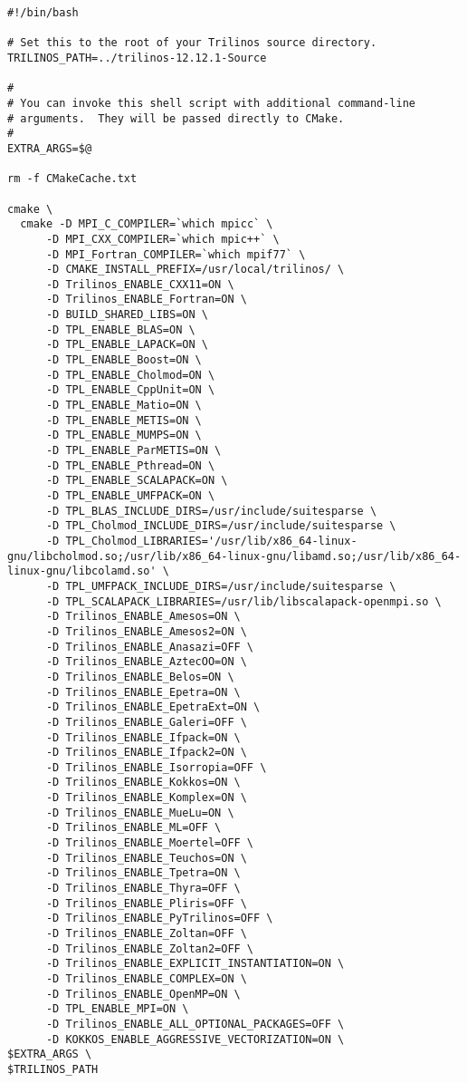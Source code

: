 \begin{verbatim}
#!/bin/bash

# Set this to the root of your Trilinos source directory.
TRILINOS_PATH=../trilinos-12.12.1-Source

#
# You can invoke this shell script with additional command-line
# arguments.  They will be passed directly to CMake.
#
EXTRA_ARGS=$@

rm -f CMakeCache.txt

cmake \
  cmake -D MPI_C_COMPILER=`which mpicc` \
      -D MPI_CXX_COMPILER=`which mpic++` \
      -D MPI_Fortran_COMPILER=`which mpif77` \
      -D CMAKE_INSTALL_PREFIX=/usr/local/trilinos/ \
      -D Trilinos_ENABLE_CXX11=ON \
      -D Trilinos_ENABLE_Fortran=ON \
      -D BUILD_SHARED_LIBS=ON \
      -D TPL_ENABLE_BLAS=ON \
      -D TPL_ENABLE_LAPACK=ON \
      -D TPL_ENABLE_Boost=ON \
      -D TPL_ENABLE_Cholmod=ON \
      -D TPL_ENABLE_CppUnit=ON \
      -D TPL_ENABLE_Matio=ON \
      -D TPL_ENABLE_METIS=ON \
      -D TPL_ENABLE_MUMPS=ON \
      -D TPL_ENABLE_ParMETIS=ON \
      -D TPL_ENABLE_Pthread=ON \
      -D TPL_ENABLE_SCALAPACK=ON \
      -D TPL_ENABLE_UMFPACK=ON \
      -D TPL_BLAS_INCLUDE_DIRS=/usr/include/suitesparse \
      -D TPL_Cholmod_INCLUDE_DIRS=/usr/include/suitesparse \
      -D TPL_Cholmod_LIBRARIES='/usr/lib/x86_64-linux-gnu/libcholmod.so;/usr/lib/x86_64-linux-gnu/libamd.so;/usr/lib/x86_64-linux-gnu/libcolamd.so' \
      -D TPL_UMFPACK_INCLUDE_DIRS=/usr/include/suitesparse \
      -D TPL_SCALAPACK_LIBRARIES=/usr/lib/libscalapack-openmpi.so \
      -D Trilinos_ENABLE_Amesos=ON \
      -D Trilinos_ENABLE_Amesos2=ON \
      -D Trilinos_ENABLE_Anasazi=OFF \
      -D Trilinos_ENABLE_AztecOO=ON \
      -D Trilinos_ENABLE_Belos=ON \
      -D Trilinos_ENABLE_Epetra=ON \
      -D Trilinos_ENABLE_EpetraExt=ON \
      -D Trilinos_ENABLE_Galeri=OFF \
      -D Trilinos_ENABLE_Ifpack=ON \
      -D Trilinos_ENABLE_Ifpack2=ON \
      -D Trilinos_ENABLE_Isorropia=OFF \
      -D Trilinos_ENABLE_Kokkos=ON \
      -D Trilinos_ENABLE_Komplex=ON \
      -D Trilinos_ENABLE_MueLu=ON \
      -D Trilinos_ENABLE_ML=OFF \
      -D Trilinos_ENABLE_Moertel=OFF \
      -D Trilinos_ENABLE_Teuchos=ON \
      -D Trilinos_ENABLE_Tpetra=ON \
      -D Trilinos_ENABLE_Thyra=OFF \
      -D Trilinos_ENABLE_Pliris=OFF \
      -D Trilinos_ENABLE_PyTrilinos=OFF \
      -D Trilinos_ENABLE_Zoltan=OFF \
      -D Trilinos_ENABLE_Zoltan2=OFF \
      -D Trilinos_ENABLE_EXPLICIT_INSTANTIATION=ON \
      -D Trilinos_ENABLE_COMPLEX=ON \
      -D Trilinos_ENABLE_OpenMP=ON \
      -D TPL_ENABLE_MPI=ON \
      -D Trilinos_ENABLE_ALL_OPTIONAL_PACKAGES=OFF \
      -D KOKKOS_ENABLE_AGGRESSIVE_VECTORIZATION=ON \
$EXTRA_ARGS \
$TRILINOS_PATH
\end{verbatim}
